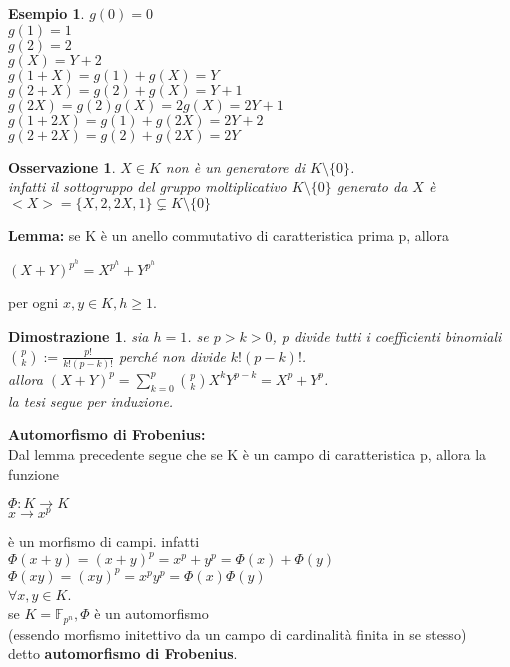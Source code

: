 \documentclass[a4paper,12pt]{article}
\theoremstyle{def}
\theoremstyle{prop}
\theoremstyle{esempio}
\newtheorem*{example}{Esempio}
\theoremstyle{dimostrazione}
\newtheorem*{dimostrazione}{Dimostrazione}
\theoremstyle{teo}
\theoremstyle{osservazione}
\newtheorem*{osservazione}{Osservazione}
\begin{document}
\begin{example}
	\(g(0) = 0\)\\
	\(g(1) = 1\)\\
	\(g(2) = 2\)\\
	\(g(X) = Y + 2\)\\
	\(g(1 + X) = g(1) + g(X) = Y\)\\
	\(g(2 + X) = g(2) + g(X) = Y + 1\)\\
	\(g(2X) = g(2)g(X) = 2g(X) = 2Y + 1\)\\
	\(g(1 + 2X) = g(1) + g(2X) = 2Y + 2\)\\
	\(g(2 + 2X) = g(2) + g(2X) = 2Y\)\\
\end{example}

\begin{osservazione}
	\(X \in K\) non è un generatore di \(K \setminus \{0\}\).\\
	infatti il sottogruppo del gruppo moltiplicativo \(K \setminus \{0\}\) generato da \(X\) è\\
	\(<X> = \{X, 2, 2X, 1\} \subsetneq K \setminus \{0\}\)\\
\end{osservazione}

\newpage

\textbf{Lemma:} se K è un anello commutativo di caratteristica prima p, allora
\begin{center}
	\((X + Y)^{p^h} = X^{p^h} + Y^{p^h}\)
\end{center}
per ogni \(x, y \in K, h \geq 1\).

\begin{dimostrazione}
	sia \(h = 1\). se \(p > k > 0\), p divide tutti i coefficienti binomiali\\
	\(\binom{p}{k} := \frac{p!}{k!(p-k)!}\) perché non divide \(k!(p-k)!\).\\
	allora \((X + Y)^p = \sum_{k=0}^{p} \binom{p}{k} X^k Y^{p-k} = X^p + Y^p\).\\
	la tesi segue per induzione.\\
\end{dimostrazione}

\textbf{Automorfismo di Frobenius:}\\
Dal lemma precedente segue che se K è un campo di caratteristica p, allora la funzione 
\begin{center}
	\(\Phi : K \rightarrow K\)\\
	\(x \rightarrow x^p\)
\end{center}
è un morfismo di campi. infatti\\
\(\Phi(x + y) = (x + y)^p = x^p + y^p = \Phi(x) + \Phi(y)\)\\
\(\Phi(xy) = (xy)^p = x^p y^p = \Phi(x) \Phi(y)\)\\
\(\forall x,y \in K\).\\
se \(K = \mathbb{F}_{p^n}, \Phi\) è un automorfismo\\
(essendo morfismo initettivo da un campo di cardinalità finita in se stesso)\\
detto \textbf{automorfismo di Frobenius}.
\end{document}
